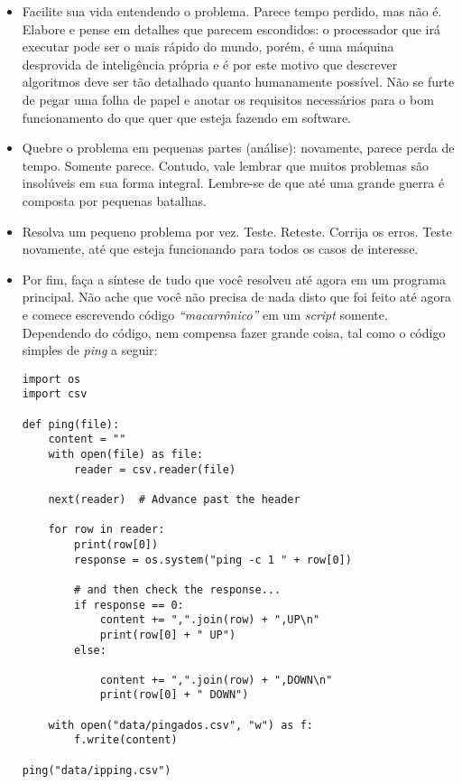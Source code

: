 \documentclass[a4paper, 12pt, onecolumn,singlespacing]{article}
\begin{document}
\begin{itemize}
	\item Facilite sua vida entendendo o problema. Parece tempo perdido, mas não é. Elabore e pense em detalhes que parecem escondidos: o processador que irá executar pode ser o mais rápido do mundo, porém, é uma máquina desprovida de inteligência própria e é por este motivo que descrever algoritmos deve ser tão detalhado quanto humanamente possível. Não se furte de pegar uma folha de papel e anotar os requisitos necessários para o bom funcionamento do que quer que esteja fazendo em software.
	
	\item Quebre o problema em pequenas partes (análise): novamente, parece perda de tempo. Somente parece. Contudo, vale lembrar que muitos problemas são insolúveis em sua forma integral. Lembre-se de que até uma grande guerra é composta por pequenas batalhas. 
	
	\item Resolva um pequeno problema por vez. Teste. Reteste. Corrija os erros. Teste novamente, até que esteja funcionando para todos os casos de interesse.
	
	\item Por fim, faça a síntese de tudo que você resolveu até agora em um programa principal. Não ache que você não precisa de nada disto que foi feito até agora e comece escrevendo código \textit{``macarrônico''} em um \textit{script} somente. Dependendo do código, nem compensa fazer grande coisa, tal como o código simples de \textit{ping} a seguir:
	
\begin{verbatim}
import os
import csv
	
def ping(file):
	content = ""
	with open(file) as file:
		reader = csv.reader(file)
	
	next(reader)  # Advance past the header
	
	for row in reader:
		print(row[0])
		response = os.system("ping -c 1 " + row[0])
	
		# and then check the response...
		if response == 0:
			content += ",".join(row) + ",UP\n"
			print(row[0] + " UP")
		else:
		
			content += ",".join(row) + ",DOWN\n"
			print(row[0] + " DOWN")
	
	with open("data/pingados.csv", "w") as f:
		f.write(content)

ping("data/ipping.csv")
\end{verbatim}


\end{itemize}
\end{document}
